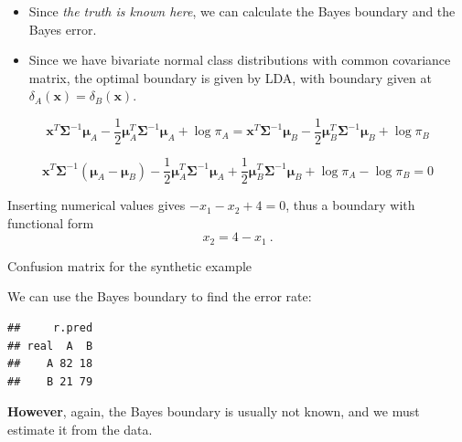 \documentclass[10pt,ignorenonframetext,]{beamer}
\newenvironment{Shaded}{\begin{snugshade}}{\end{snugshade}}
\newcommand{\KeywordTok}[1]{\textcolor[rgb]{0.13,0.29,0.53}{\textbf{#1}}}
\newcommand{\DataTypeTok}[1]{\textcolor[rgb]{0.13,0.29,0.53}{#1}}
\newcommand{\DecValTok}[1]{\textcolor[rgb]{0.00,0.00,0.81}{#1}}
\newcommand{\StringTok}[1]{\textcolor[rgb]{0.31,0.60,0.02}{#1}}
\newcommand{\OperatorTok}[1]{\textcolor[rgb]{0.81,0.36,0.00}{\textbf{#1}}}
\newcommand{\NormalTok}[1]{#1}
\begin{document}
\begin{frame}

\begin{itemize}
\item
  Since \emph{the truth is known here}, we can calculate the Bayes
  boundary and the Bayes error.
\item
  Since we have bivariate normal class distributions with common
  covariance matrix, the optimal boundary is given by LDA, with boundary
  given at \(\delta_A({\boldsymbol x})=\delta_B({\boldsymbol x})\).
\end{itemize}

\[{\boldsymbol x}^T \boldsymbol{\Sigma}^{-1}\boldsymbol\mu_A - \frac{1}{2}\boldsymbol\mu_A^T \boldsymbol{\Sigma}^{-1}\boldsymbol\mu_A + \log \pi_A={\boldsymbol x}^T \boldsymbol{\Sigma}^{-1}\boldsymbol\mu_B - \frac{1}{2}\boldsymbol\mu_B^T \boldsymbol{\Sigma}^{-1}\boldsymbol\mu_B + \log \pi_B\]

\[{\boldsymbol x}^T\boldsymbol{\Sigma}^{-1}(\boldsymbol\mu_A -\boldsymbol\mu_B)-\frac{1}{2}\boldsymbol\mu_A^T \boldsymbol{\Sigma}^{-1}\boldsymbol\mu_A +\frac{1}{2}\boldsymbol\mu_B^T \boldsymbol{\Sigma}^{-1}\boldsymbol\mu_B +\log \pi_A-\log \pi_B=0\]

Inserting numerical values gives \(-x_1-x_2+4=0\), thus a boundary with
functional form \[x_2=4-x_1 \ .\]

\end{frame}

\begin{frame}[fragile]

\begin{block}{Confusion matrix for the synthetic example}

\vspace{2mm}

We can use the Bayes boundary to find the error rate:

\scriptsize

\begin{Shaded}
\end{Shaded}

\begin{verbatim}
##     r.pred
## real  A  B
##    A 82 18
##    B 21 79
\end{verbatim}

\vspace{2mm} \normalsize

\textbf{However}, again, the Bayes boundary is usually not known, and we
must estimate it from the data.

\end{block}

\end{frame}
\end{document}
